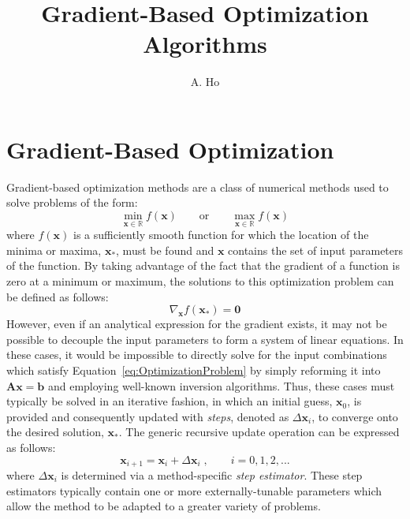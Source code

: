\documentclass{article}
\title{Gradient-Based Optimization Algorithms}
\author{A. Ho}
\begin{document}
\maketitle

\section{Gradient-Based Optimization}
\label{sec:GradOptimization}

Gradient-based optimization methods are a class of numerical methods used to solve problems of the form:
\begin{equation}
\label{eq:OptimizationProblem}
	\min_{\mathbf{x} \in \mathbb{R}} f\!\left(\mathbf{x}\right) \qquad \text{or} \qquad \max_{\mathbf{x} \in \mathbb{R}} f\!\left(\mathbf{x}\right)
\end{equation}
where $f\!\left(\mathbf{x}\right)$ is a sufficiently smooth function for which the location of the minima or maxima, $\mathbf{x_*}$, must be found and $\mathbf{x}$ contains the set of input parameters of the function. By taking advantage of the fact that the gradient of a function is zero at a minimum or maximum, the solutions to this optimization problem can be defined as follows:
\begin{equation}
\label{eq:GeneralOptimizationSolution}
	\nabla_{\mathbf{x}} f\!\left(\mathbf{x_*}\right) = \mathbf{0}
\end{equation}
However, even if an analytical expression for the gradient exists, it may not be possible to decouple the input parameters to form a system of linear equations. In these cases, it would be impossible to directly solve for the input combinations which satisfy Equation~\eqref{eq:OptimizationProblem} by simply reforming it into $\mathbf{A}\mathbf{x} = \mathbf{b}$ and employing well-known inversion algorithms. Thus, these cases must typically be solved in an iterative fashion, in which an initial guess, $\mathbf{x}_0$, is provided and consequently updated with \emph{steps}, denoted as $\Delta\mathbf{x}_i$, to converge onto the desired solution, $\mathbf{x_*}$. The generic recursive update operation can be expressed as follows:
\begin{equation}
\label{eq:UpdateEquation}
	\mathbf{x}_{i+1} = \mathbf{x}_i + \Delta \mathbf{x}_i \; , \qquad i = 0,1,2,...
\end{equation}
where $\Delta\mathbf{x}_i$ is determined via a method-specific \emph{step estimator}. These step estimators typically contain one or more externally-tunable parameters which allow the method to be adapted to a greater variety of problems.
\end{document}
